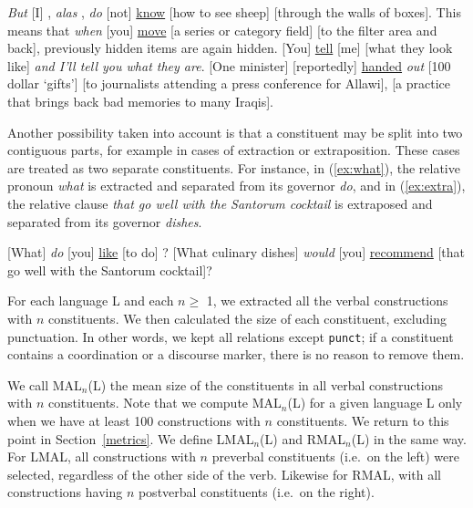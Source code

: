 \pex\label{ex:1}
\a\label{ex:aux}\textit{But} [I] , \textit{alas} , \textit{do} [not] \underline{know} [how to see sheep] [through the walls of boxes]. 
\a\label{ex:notmain}This means that \textit{when} [you] \underline{move} [a series or category field] [to the filter area and back], previously hidden items are again hidden. 
\a\label{ex:coord}[You] \underline{tell} [me] [what they look like] \textit{and I'll tell you what they are}. 
\a\label{ex:out}[One minister] [reportedly] \underline{handed} \textit{out} [100 dollar `gifts'] [to journalists attending a press conference for Allawi], [a practice that brings back bad memories to many Iraqis]. 
\xe

Another possibility taken into account is that a constituent may be split into two contiguous parts, for example in cases of extraction or extraposition. These cases are treated as two separate constituents. For instance, in (\ref{ex:what}), the relative pronoun \textit{what} is extracted and separated from its governor \textit{do}, and in (\ref{ex:extra}), the relative clause \textit{that go well with the Santorum cocktail} is extraposed and separated from its governor \textit{dishes}.

\pex
\a\label{ex:what}[What] \textit{do} [you] \underline{like} [to do] ?  
\a\label{ex:extra}[What culinary dishes] \textit{would} [you] \underline{recommend} [that go well with the Santorum cocktail]? 
\xe

For each language L and each $n \geq$ 1, we extracted all the verbal constructions with $n$ constituents. We then calculated the size of each constituent, excluding punctuation. In other words, we kept all relations except \texttt{punct}; if a constituent contains a coordination or a discourse marker, there is no reason to remove them. 

We call MAL$_n$(L) the mean size of the constituents in all verbal constructions with $n$ constituents. Note that we compute MAL$_n$(L) for a given language L only when we have at least 100 constructions with $n$ constituents. We return to this point in Section~\ref{metrics}. We define LMAL$_n$(L) and RMAL$_n$(L) in the same way. For LMAL, all constructions with $n$ preverbal constituents (i.e.\ on the left) were selected, regardless of the other side of the verb. Likewise for RMAL, with all constructions having $n$ postverbal constituents (i.e.\ on the right).

